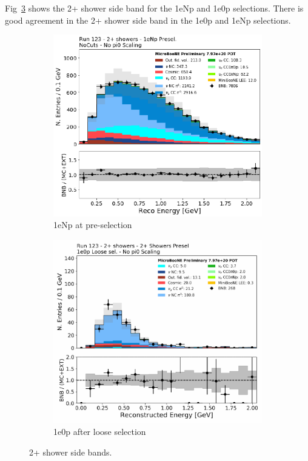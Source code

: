 Fig~\ref{fig:fakedata:set2:2shr} shows the 2+ shower side band for the 1eNp and 1e0p selections. There is good agreement in the 2+ shower side band in the 1e0p and 1eNp selections.  

\begin{figure}[H] 
\begin{center}
    \begin{subfigure}[b]{0.45\textwidth}
    \centering
    \includegraphics[width=1.00\textwidth]{Fakedata/set2/np_2shr.pdf}
    \caption{\label{fig:fakedata:set2:2shrnp} 1eNp at pre-selection}
    \end{subfigure}
    \begin{subfigure}[b]{0.45\textwidth}
    \centering
    \includegraphics[width=1.00\textwidth]{Fakedata/set2/zp_2shr.pdf}
    \caption{\label{fig:fakedata:set2:2shr0p} 1e0p after loose selection}
    \end{subfigure}
\caption{\label{fig:fakedata:set2:2shr} 2+ shower side bands.}
\end{center}
\end{figure}


